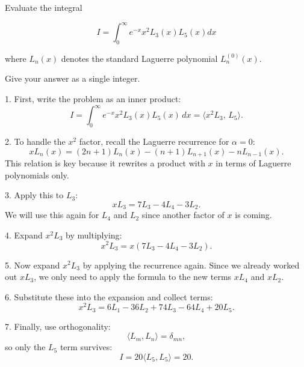 Evaluate the integral

$$
I = \int_{0}^{\infty} e^{-x} x^{2} L_{3}(x) L_{5}(x) dx
$$

where $L_{n}(x)$ denotes the standard Laguerre polynomial $L_n^{(0)}(x)$.

Give your answer as a single integer.

1. First, write the problem as an inner product:
$$
I = \int_{0}^{\infty} e^{-x} x^2 L_3(x) L_5(x)\, dx 
   = \langle x^2 L_3,\, L_5 \rangle.
$$

2. To handle the $x^2$ factor, recall the Laguerre recurrence for $\alpha=0$:
$$
x L_n(x) = (2n+1)L_n(x) - (n+1)L_{n+1}(x) - nL_{n-1}(x).
$$
This relation is key because it rewrites a product with $x$ in terms of Laguerre polynomials only.

3. Apply this to $L_3$:
$$
xL_3 = 7L_3 - 4L_4 - 3L_2.
$$
We will use this again for $L_4$ and $L_2$ since another factor of $x$ is coming.

4. Expand $x^2 L_3$ by multiplying:
$$
x^2 L_3 = x(7L_3 - 4L_4 - 3L_2).
$$

5.  Now expand $x^2L_3$ by applying the recurrence again. Since we already worked out $xL_3$, we only need to apply the formula to the new terms $xL_4$ and $xL_2$.

6. Substitute these into the expansion and collect terms:
$$
x^2 L_3 = 6L_1 - 36L_2 + 74L_3 - 64L_4 + 20L_5.
$$

7. Finally, use orthogonality:
$$
\langle L_m, L_n \rangle = \delta_{mn},
$$
so only the $L_5$ term survives:
$$
I = 20 \langle L_5, L_5 \rangle = 20.
$$